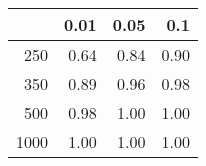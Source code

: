 % 
\begin{tabular}{rrrr}
  \hline
 & 0.01 & 0.05 & 0.1 \\ 
  \hline
250 & 0.64 & 0.84 & 0.90 \\ 
  350 & 0.89 & 0.96 & 0.98 \\ 
  500 & 0.98 & 1.00 & 1.00 \\ 
  1000 & 1.00 & 1.00 & 1.00 \\ 
   \hline
\end{tabular}
